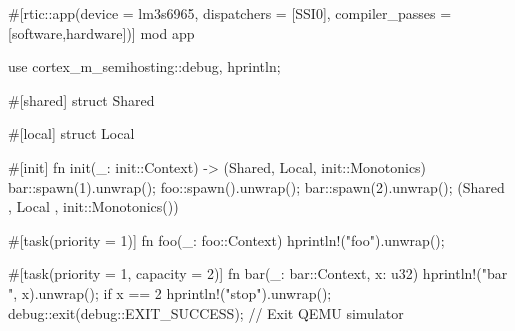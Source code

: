 #[rtic::app(device = lm3s6965, dispatchers = [SSI0], compiler_passes = [software,hardware])]
mod app {
    use cortex_m_semihosting::{debug, hprintln};

    #[shared]
    struct Shared {}

    #[local]
    struct Local {}

    #[init]
    fn init(_: init::Context) -> (Shared, Local, init::Monotonics) {
        bar::spawn(1).unwrap();
        foo::spawn().unwrap();
        bar::spawn(2).unwrap();
        (Shared {}, Local {}, init::Monotonics())
    }

    
    #[task(priority = 1)]
    fn foo(_: foo::Context) {
        hprintln!("foo").unwrap();
    } 
    
    #[task(priority = 1, capacity = 2)]
    fn bar(_: bar::Context, x: u32) {
        hprintln!("bar {}", x).unwrap();
        if x == 2{
            hprintln!("stop").unwrap();
            debug::exit(debug::EXIT_SUCCESS); // Exit QEMU simulator
        }
    }
}
